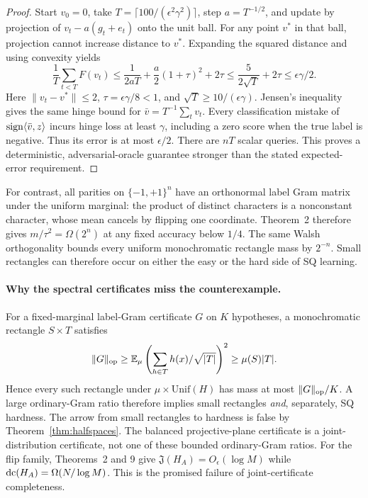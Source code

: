 \begin{proof}
Start $v_0=0$, take $T=\lceil100/(\epsilon^2\gamma^2)\rceil$, step $a=T^{-1/2}$, and update by projection of $v_t-a(g_t+e_t)$ onto the unit ball. For any point $v^*$ in that ball, projection cannot increase distance to $v^*$. Expanding the squared distance and using convexity yields
\[
 \frac1T\sum_{t<T}F(v_t)
 \le\frac1{2aT}+\frac a2(1+\tau)^2+2\tau
 \le\frac{5}{2\sqrt T}+2\tau
 \le\epsilon\gamma/2.
\]
Here $\|v_t-v^*\|\le2$, $\tau=\epsilon\gamma/8<1$, and $\sqrt T\ge10/(\epsilon\gamma)$. Jensen's inequality gives the same hinge bound for $\bar v=T^{-1}\sum_t v_t$. Every classification mistake of $\operatorname{sign}\langle\bar v,z\rangle$ incurs hinge loss at least $\gamma$, including a zero score when the true label is negative. Thus its error is at most $\epsilon/2$. There are $nT$ scalar queries. This proves a deterministic, adversarial-oracle guarantee stronger than the stated expected-error requirement.
\end{proof}

For contrast, all parities on $\{-1,+1\}^n$ have an orthonormal label Gram matrix under the uniform marginal: the product of distinct characters is a nonconstant character, whose mean cancels by flipping one coordinate. Theorem~2 therefore gives $m/\tau^2=\Omega(2^n)$ at any fixed accuracy below $1/4$. The same Walsh orthogonality bounds every uniform monochromatic rectangle mass by $2^{-n}$. Small rectangles can therefore occur on either the easy or the hard side of SQ learning.



\paragraph{Why the spectral certificates miss the counterexample.}
For a fixed-marginal label-Gram certificate $G$ on $K$ hypotheses, a monochromatic rectangle $S\times T$ satisfies
\[
 \|G\|_{\rm op}\ge\mathbb E_\mu\left(\sum_{h\in T}h(x)/\sqrt{|T|}\right)^2
 \ge\mu(S)|T|.
\]
Hence every such rectangle under $\mu\times\mathrm{Unif}(H)$ has mass at most $\|G\|_{\rm op}/K$. A large ordinary-Gram ratio therefore implies small rectangles \emph{and}, separately, SQ hardness. The arrow from small rectangles to hardness is false by Theorem~\ref{thm:halfspaces}. The balanced projective-plane certificate is a joint-distribution certificate, not one of these bounded ordinary-Gram ratios. For the flip family, Theorems~2 and 9 give $\mathfrak J(H_A)=O_\epsilon(\log M)$ while $\operatorname{dc}(H_A)=\Omega(N/\log M)$. This is the promised failure of joint-certificate completeness.

